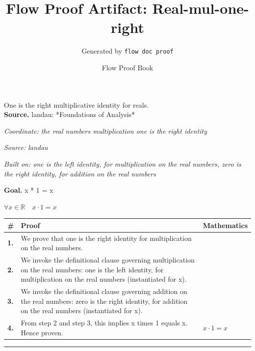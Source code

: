 \documentclass[11pt]{article}
\title{Flow Proof Artifact: Real-mul-one-right}
\author{Generated by \texttt{flow doc proof}}
\date{Flow Proof Book}
\theoremstyle{definition}
\begin{document}
\maketitle
One is the right multiplicative identity for reals.\\[0.5em]
\textbf{Source.} landau: *Foundations of Analysis*\\[0.5em]
\bigskip
{}\par
\smallskip\noindent\textit{Coordinate: the real numbers \cdot multiplication \cdot one is the right identity}\par
\smallskip\noindent\textit{Source: landau}\par
\smallskip\noindent\textit{Built on: one is the left identity, for multiplication on the real numbers, zero is the right identity, for addition on the real numbers}\par
\medskip
\noindent\textbf{Goal.} x * 1 = x\par
\noindent$\displaystyle \forall x \in \mathbb{R}\quad x \cdot 1 = x$\par
\medskip
\noindent
\begin{tabular}{@{} >{\raggedright\arraybackslash}p{} >{\raggedright\arraybackslash}p{} >{\raggedleft\arraybackslash}p{} @{}}
\textbf{\#} & \textbf{Proof} & \textbf{Mathematics} \\
\midrule
\textbf{1.} & We prove that one is the right identity for multiplication on the real numbers. & \\[0.45em]
\textbf{2.} & We invoke the definitional clause governing multiplication on the real numbers: one is the left identity, for multiplication on the real numbers (instantiated for x). & \\[0.45em]
\textbf{3.} & We invoke the definitional clause governing addition on the real numbers: zero is the right identity, for addition on the real numbers (instantiated for x). & \\[0.45em]
\textbf{4.} & From step 2 and step 3, this implies x times 1 equals x. Hence proven. & $\displaystyle x \cdot 1 = x$ \\[0.45em]
\bottomrule
\end{tabular}
\label{thm:Real-multiplication-one_is_the_right_identity}
\par\medskip\hrule
\end{document}
